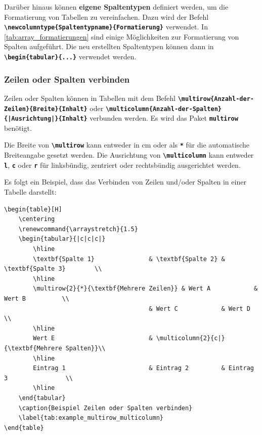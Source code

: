\vspace{0.4cm}

Darüber hinaus können \textbf{eigene Spaltentypen} definiert werden, um die Formatierung von Tabellen zu vereinfachen. Dazu wird der Befehl \textbf{\texttt{\textbackslash newcolumntype\{Spaltentypname\}\{Formatierung\}}} verwendet. In \autoref{tab:array_formatierungen} sind einige Möglichkeiten zur Formatierung von Spalten aufgeführt. Die neu erstellten Spaltentypen können dann in \textbf{\texttt{\textbackslash begin\{tabular\}\{...\}}} verwendet werden.


\subsubsection{Zeilen oder Spalten verbinden}
Zeilen oder Spalten können in Tabellen mit dem Befehl \newline \textbf{\texttt{\textbackslash multirow\{Anzahl-der-Zeilen\}\{Breite\}\{Inhalt\}}} oder \newline \textbf{\texttt{\textbackslash multicolumn\{Anzahl-der-Spalten\}\{|Ausrichtung|\}\{Inhalt\}}} verbunden werden. Es wird das Paket \textbf{\texttt{multirow}} benötigt.

Die Breite von \textbf{\texttt{\textbackslash multirow}} kann entweder in cm oder als \textbf{\texttt{*}} für die automatische Breiteangabe gesetzt werden. Die Ausrichtung von \textbf{\texttt{\textbackslash multicolumn}} kann entweder \textbf{\texttt{l}}, \textbf{\texttt{c}} oder \textbf{\texttt{r}} für linksbündig, zentriert oder rechtsbündig ausgerichtet werden.

Es folgt ein Beispiel, dass das Verbinden von Zeilen und/oder Spalten in einer Tabelle darstellt:

\begin{lstlisting}[language={[LaTeX]TeX}, basicstyle=\footnotesize\ttfamily]
\begin{table}[H]
    \centering
    \renewcommand{\arraystretch}{1.5}
    \begin{tabular}{|c|c|c|}
        \hline
        \textbf{Spalte 1}               & \textbf{Spalte 2} & \textbf{Spalte 3}        \\
        \hline
        \multirow{2}{*}{\textbf{Mehrere Zeilen}} & Wert A            & Wert B          \\
                                        & Wert C            & Wert D                   \\
        \hline
        Wert E                          & \multicolumn{2}{c|}{\textbf{Mehrere Spalten}}\\
        \hline
        Eintrag 1                       & Eintrag 2         & Eintrag 3                \\
        \hline
    \end{tabular}
    \caption{Beispiel Zeilen oder Spalten verbinden}
    \label{tab:example_multirow_multicolumn}
\end{table}
\end{lstlisting}

